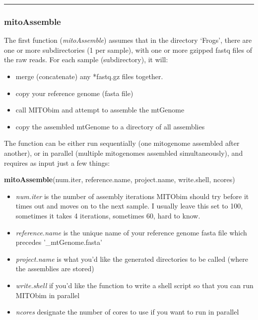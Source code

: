 \documentclass[]{article}
\newenvironment{Shaded}{\begin{snugshade}}{\end{snugshade}}
\newcommand{\KeywordTok}[1]{\textcolor[rgb]{0.13,0.29,0.53}{\textbf{#1}}}
\newcommand{\NormalTok}[1]{#1}
\providecommand{\tightlist}{%
  \setlength{\itemsep}{0pt}\setlength{\parskip}{0pt}}
\renewcommand{\linethickness}{0.05em}
\begin{document}
\begin{center}\rule{0.5\linewidth}{\linethickness}\end{center}

\hypertarget{mitoassemble}{%
\subsubsection{mitoAssemble}\label{mitoassemble}}

The first function (\emph{mitoAssemble}) assumes that in the directory
`Frogs', there are one or more subdirectories (1 per sample), with one
or more gzipped fastq files of the raw reads. For each sample
(subdirectory), it will:

\begin{itemize}
\tightlist
\item
  merge (concatenate) any *fastq.gz files together.\\
\item
  copy your reference genome (fasta file)\\
\item
  call MITObim and attempt to assemble the mtGenome\\
\item
  copy the assembled mtGenome to a directory of all assemblies
\end{itemize}

The function can be either run sequentially (one mitogenome assembled
after another), or in parallel (multiple mitogenomes assembled
simultaneously), and requires as input just a few things:

\begin{Shaded}
\begin{Highlighting}[]
\KeywordTok{mitoAssemble}\NormalTok{(num.iter, reference.name, project.name,}
\NormalTok{             write.shell, ncores)}
\end{Highlighting}
\end{Shaded}

\begin{itemize}
\tightlist
\item
  \emph{num.iter} is the number of assembly iterations MITObim should
  try before it times out and moves on to the next sample. I usually
  leave this set to 100, sometimes it takes 4 iterations, sometimes 60,
  hard to know.\\
\item
  \emph{reference.name} is the unique name of your reference genome
  fasta file which precedes '\_mtGenome.fasta'\\
\item
  \emph{project.name} is what you'd like the generated directories to be
  called (where the assemblies are stored)
\item
  \emph{write.shell} if you'd like the function to write a shell script
  so that you can run MITObim in parallel
\item
  \emph{ncores} designate the number of cores to use if you want to run
  in parallel
\end{itemize}
\end{document}
